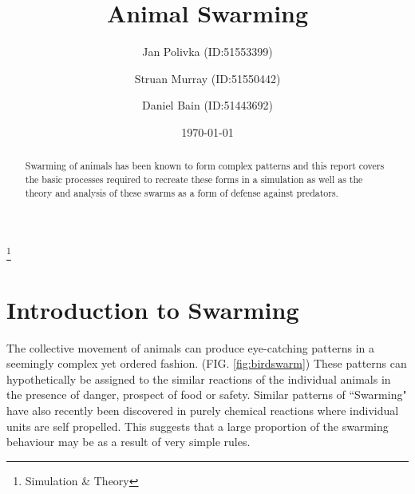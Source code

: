 \documentclass[
reprint,
showpacs,preprintnumbers,
amsmath,amssymb,
prl,
]{revtex4-1}
\begin{document}
\title{Animal Swarming} %
\thanks{Simulation \& Theory}

\author{Jan Polivka (ID:51553399)}
\author{Struan Murray (ID:51550442)}
\author{Daniel Bain (ID:51443692)}

\date{\today}

\begin{abstract}
	\noindent{}Swarming of animals has been known to form complex patterns and this report covers the basic processes required to recreate these forms in a simulation as well as the theory and analysis of these swarms as a form of defense against predators.
\end{abstract}

\maketitle


\section{\label{sec:level1}Introduction to Swarming}

The collective movement of animals can produce eye-catching patterns in a seemingly complex yet ordered fashion. (FIG. \ref{fig:birdswarm})
These patterns can hypothetically be assigned to the similar reactions of the individual animals in the presence of danger, prospect of food or safety.
Similar patterns of ``Swarming" have also recently been discovered in purely chemical reactions where individual units are self propelled.\cite{collectivemotion}
This suggests that a large proportion of the swarming behaviour may be as a result of very simple rules.
\end{document}

